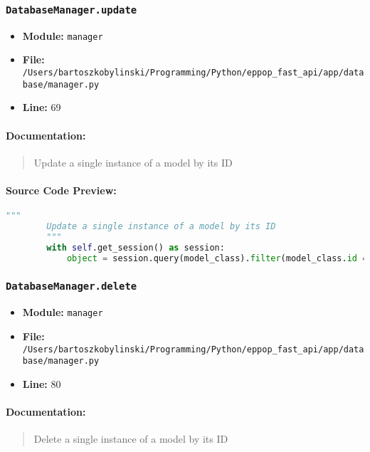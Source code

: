 \documentclass[11pt,a4paper]{article}
\begin{document}
\vspace{1em}
\subsubsection{\texttt{DatabaseManager.update}}

\begin{itemize}
    \item \textbf{Module:} \texttt{manager}
    \item \textbf{File:} \texttt{/Users/bartoszkobylinski/Programming/Python/eppop\_fast\_api/app/database/manager.py}
    \item \textbf{Line:} 69
\end{itemize}

\paragraph{Documentation:}
\begin{quote}
Update a single instance of a model by its ID
\end{quote}

\paragraph{Source Code Preview:}
\begin{lstlisting}[language=Python]
        """
        Update a single instance of a model by its ID
        """
        with self.get_session() as session:
            object = session.query(model_class).filter(model_class.id == object_id).one()
\end{lstlisting}

\vspace{1em}
\subsubsection{\texttt{DatabaseManager.delete}}

\begin{itemize}
    \item \textbf{Module:} \texttt{manager}
    \item \textbf{File:} \texttt{/Users/bartoszkobylinski/Programming/Python/eppop\_fast\_api/app/database/manager.py}
    \item \textbf{Line:} 80
\end{itemize}

\paragraph{Documentation:}
\begin{quote}
Delete a single instance of a model by its ID
\end{quote}
\end{document}
